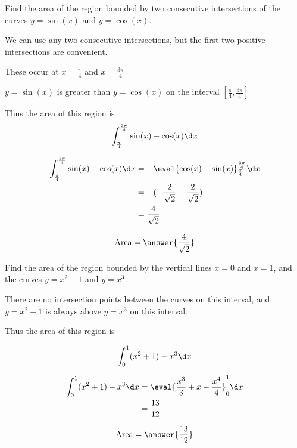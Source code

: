 \documentclass[handout]{ximera}
\begin{document}
\begin{exercise}
Find the area of the region bounded by two consecutive intersections of the curves $y=\sin(x)$ and $y = \cos(x)$.

\begin{hint}
  We can use any two consecutive intersections, but the first two positive intersections are convenient.

  These occur at $x = \frac{\pi}{4}$ and $x = \frac{3\pi}{4}$
\end{hint}

\begin{hint}
  $y = \sin(x)$ is greater than $y=\cos(x)$ on the interval $[\frac{\pi}{4},\frac{3\pi}{4}]$
\end{hint}

\begin{hint}
	Thus the area of this region is
	\[
	\int_{\frac{\pi}{4}}^{\frac{3\pi}{4}} \sin(x) - \cos(x) \d x
	\]
\end{hint}

\begin{hint}
  \begin{align*}
	  \int_{\frac{\pi}{4}}^{\frac{3\pi}{4}} \sin(x) - \cos(x) \d x &=  -\eval{\cos(x)+\sin(x)}_{\frac{\pi}{4}}^{\frac{3\pi}{4}}  \d x\\
		&=-(-\frac{2}{\sqrt{2}} - \frac{2}{\sqrt{2}})\\
		&= \frac{4}{\sqrt{2}}
	\end{align*}
\end{hint}

  \[
  \textrm{Area} = \answer{\frac{4}{\sqrt{2}}}
  \]

\end{exercise}

\begin{exercise}
Find the area of the region bounded by the vertical lines $x=0$ and $x=1$, and the curves $y = x^2+1$ and $y = x^3$.

\begin{hint}
	There are no intersection points between the curves on this interval, and $y = x^2+1$ is always above $y=x^3$ on this interval.
\end{hint}


\begin{hint}
	Thus the area of this region is

	\[
	\int_{0}^{1} (x^2+1)-x^3 \d x
	\]
\end{hint}

\begin{hint}
	\begin{align*}
		\int_{0}^{1} (x^2+1)-x^3 \d x &=  \eval{\frac{x^3}{3}+x-\frac{x^4}{4}}_0^1  \d x\\
		&= \frac{13}{12}
	\end{align*}
\end{hint}

	\[
		\textrm{Area} = \answer{\frac{13}{12}}
	\]

\end{exercise}
\end{document}
